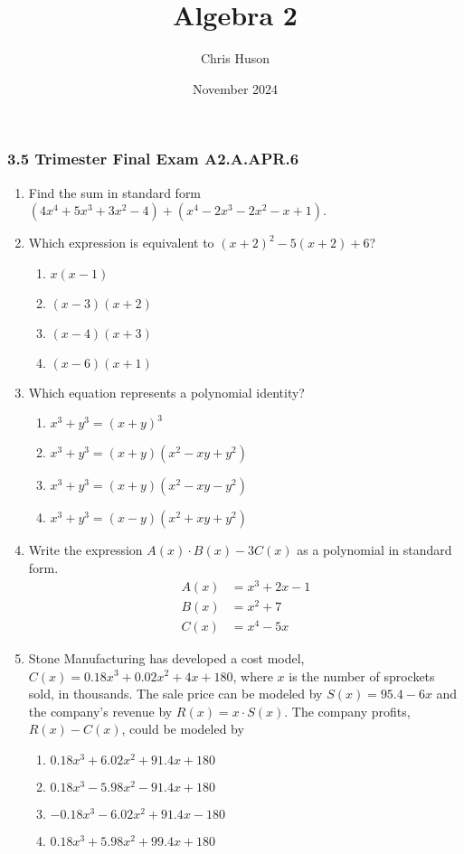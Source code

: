 \documentclass[12pt, twoside]{article}
\title{Algebra 2}
\author{Chris Huson}
\date{November 2024}
\begin{document}
\subsubsection*{3.5 Trimester Final Exam \hfill A2.A.APR.6}
\begin{enumerate}[itemsep=0.5cm]
\subsubsection*{A2-APR.1 Perform operations with polynomials}
\item Find the sum in standard form $(4x^4+5x^3+3x^2-4) + (x^4-2x^3-2x^2-x+1)$. \vspace{8cm}

\item Which expression is equivalent to $(x + 2)^2 - 5(x + 2) + 6$?
    \begin{enumerate}
        \item $x(x - 1)$
        \item $(x - 3)(x + 2)$
        \item $(x - 4)(x + 3)$
        \item $(x - 6)(x + 1)$
    \end{enumerate}
        
\item Which equation represents a polynomial identity? %
\begin{enumerate}
    \item \(x^3 + y^3 = (x + y)^3\)
    \item \(x^3 + y^3 = (x + y)(x^2 - xy + y^2)\)
    \item \(x^3 + y^3 = (x + y)(x^2 - xy - y^2)\)
    \item \(x^3 + y^3 = (x - y)(x^2 + xy + y^2)\)
\end{enumerate}

\newpage
\item Write the expression $A(x) \cdot B(x) - 3C(x)$ as a polynomial in standard form. %
    \begin{align*}
        A(x) &= x^3 + 2x - 1 \\
        B(x) &= x^2 + 7 \\
        C(x) &= x^4 - 5x
    \end{align*} \vspace{6cm}
    
\item Stone Manufacturing has developed a cost model, $C(x) = 0.18x^3 + 0.02x^2 + 4x + 180$, where $x$ is the number of sprockets sold, in thousands. The sale price can be modeled by $S(x) = 95.4 - 6x$ and the company’s revenue by $R(x) = x \cdot S(x)$. The company profits, $R(x) - C(x)$, could be modeled by %
    \begin{enumerate}
        \item $0.18x^3 + 6.02x^2 + 91.4x + 180$
        \item $0.18x^3 - 5.98x^2 - 91.4x + 180$
        \item $-0.18x^3 - 6.02x^2 + 91.4x - 180$
        \item $0.18x^3 + 5.98x^2 + 99.4x + 180$
    \end{enumerate}
    

\end{enumerate}
\end{document}
